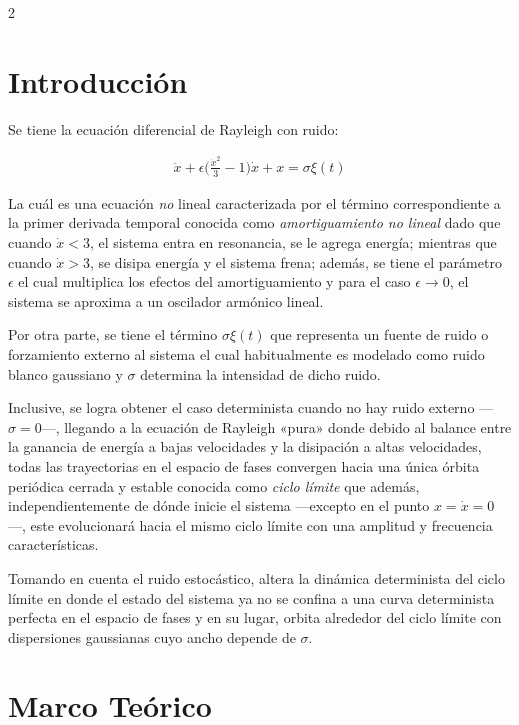 \begin{multicols}{2}

\section*{Introducción}

    Se tiene la ecuación diferencial de Rayleigh con ruido:

    \begin{align*}
        \ddot{x} + \epsilon \Bigg(\frac{\dot{x}^2}{3} - 1 \Bigg)\dot{x} + x = \sigma \xi(t)
    \end{align*}

    La cuál es una ecuación \textit{no} lineal caracterizada por el término correspondiente a la primer derivada temporal conocida como \textit{amortiguamiento no lineal} dado que cuando $\dot{x}<3$, el sistema entra en resonancia, se le agrega energía; mientras que cuando $\dot{x}>3$, se disipa energía y el sistema frena; además, se tiene el parámetro $\epsilon$ el cual multiplica los efectos del amortiguamiento y para el caso $\epsilon \longrightarrow 0$, el sistema se aproxima a un oscilador armónico lineal.

    Por otra parte, se tiene el término $\sigma \xi(t)$ que representa un fuente de ruido o forzamiento externo al sistema el cual habitualmente es modelado como ruido blanco gaussiano y $\sigma$ determina la intensidad de dicho ruido.

    Inclusive, se logra obtener el caso determinista cuando no hay ruido externo ---$\sigma = 0$---, llegando a la ecuación de Rayleigh «pura» donde debido al balance entre la ganancia de energía a bajas velocidades y la disipación a altas velocidades, todas las trayectorias en el espacio de fases convergen hacia una única órbita periódica cerrada y estable conocida como \textit{ciclo límite} que además, independientemente de dónde inicie el sistema ---excepto en el punto $x = \dot{x} = 0$---, este evolucionará hacia el mismo ciclo límite con una amplitud y frecuencia características.

    Tomando en cuenta el ruido estocástico, altera la dinámica determinista del ciclo límite en donde el estado del sistema ya no se confina a una curva determinista perfecta en el espacio de fases y en su lugar, orbita alrededor del ciclo límite con dispersiones gaussianas cuyo ancho depende de $\sigma$.

\section*{Marco Teórico}
    

\end{multicols}
